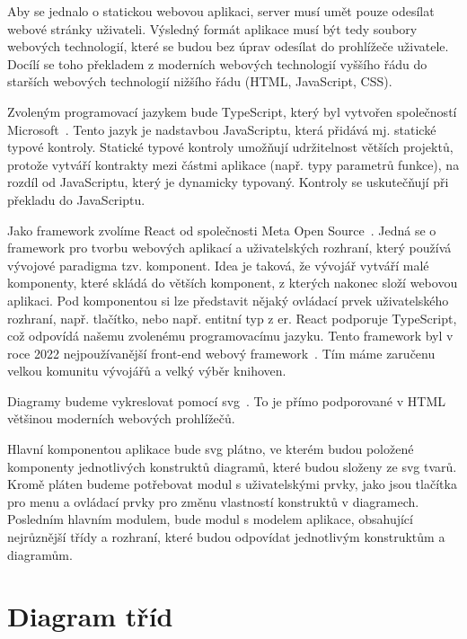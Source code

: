Aby se jednalo o statickou webovou aplikaci, server musí umět pouze odesílat webové stránky uživateli.
Výsledný formát aplikace musí být tedy soubory webových technologií, které se budou bez úprav odesílat do prohlížeče uživatele.
Docílí se toho překladem z moderních webových technologií vyššího řádu do starších webových technologií nižšího řádu (HTML, JavaScript, CSS).

Zvoleným programovací jazykem bude TypeScript, který byl vytvořen společností Microsoft~\cite{microsoft_typescriptjavascript_2023}.
Tento jazyk je nadstavbou JavaScriptu, která přidává mj. statické typové kontroly.
Statické typové kontroly umožňují udržitelnost větších projektů, protože vytváří kontrakty mezi částmi aplikace (např. typy parametrů funkce), na rozdíl od JavaScriptu, který je dynamicky typovaný.
Kontroly se uskutečňují při překladu do JavaScriptu.

Jako framework zvolíme React od společnosti Meta Open Source~\cite{react_2023}.
Jedná se o framework pro tvorbu webových aplikací a uživatelských rozhraní, který používá vývojové paradigma tzv. komponent.
Idea je taková, že vývojář vytváří malé komponenty, které skládá do větších komponent, z kterých nakonec složí webovou aplikaci.
Pod komponentou si lze představit nějaký ovládací prvek uživatelského rozhraní, např. tlačítko, nebo např. entitní typ z \acrshort{er}.
React podporuje TypeScript, což odpovídá našemu zvolenému programovacímu jazyku.
Tento framework byl v roce 2022 nejpoužívanější front-end webový framework~\cite{stackoverflow_developersurvey_2022}.
Tím máme zaručenu velkou komunitu vývojářů a velký výběr knihoven.

Diagramy budeme vykreslovat pomocí \acrfull{svg}~\cite{brinza_svg_2018}.
To je přímo podporované v HTML většinou moderních webových prohlížečů.

Hlavní komponentou aplikace bude \acrshort{svg} plátno, ve kterém budou položené komponenty jednotlivých konstruktů diagramů, které budou složeny ze \acrshort{svg} tvarů.
Kromě pláten budeme potřebovat modul s uživatelskými prvky, jako jsou tlačítka pro menu a ovládací prvky pro změnu vlastností konstruktů v diagramech.
Posledním hlavním modulem, bude modul s modelem aplikace, obsahující nejrůznější třídy a rozhraní, které budou odpovídat jednotlivým konstruktům a diagramům.

\section{Diagram tříd}

